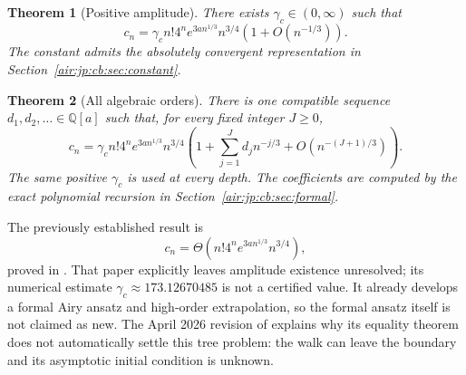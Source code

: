 \documentclass[11pt,letterpaper]{article}
\numberwithin{equation}{section}
\newtheorem{theorem}{Theorem}[section]
\theoremstyle{remark}
\newcommand{\Q}{\mathbb{Q}}
\begin{document}
\begin{theorem}[Positive amplitude]\label{air:jp:cb:thm:main}
There exists $\gamma_c\in(0,\infty)$ such that
\begin{equation}\label{air:jp:cb:eq:main}
 c_n=\gamma_c n!4^ne^{3an^{1/3}}n^{3/4}\left(1+O(n^{-1/3})\right).
\end{equation}
The constant admits the absolutely convergent representation in Section~\ref{air:jp:cb:sec:constant}.
\end{theorem}
\begin{theorem}[All algebraic orders]\label{air:jp:cb:thm:allorders}
There is one compatible sequence $d_1,d_2,\ldots\in\Q[a]$ such that, for every fixed integer $J\ge0$,
\begin{equation}\label{air:jp:cb:eq:allorders}
 c_n=\gamma_c n!4^ne^{3an^{1/3}}n^{3/4}
 \left(1+\sum_{j=1}^Jd_jn^{-j/3}+O(n^{-(J+1)/3})\right).
\end{equation}
The same positive $\gamma_c$ is used at every depth. The coefficients are computed by the exact polynomial recursion in Section~\ref{air:jp:cb:sec:formal}.
\end{theorem}

The previously established result is
\begin{equation}\label{air:jp:cb:eq:theta}
 c_n=\Theta\!\left(n!4^ne^{3an^{1/3}}n^{3/4}\right),
\end{equation}
proved in \cite[Theorem 1.1]{epfw}. That paper explicitly leaves amplitude existence unresolved; its numerical estimate $\gamma_c\approx173.12670485$ is not a certified value. It already develops a formal Airy ansatz and high-order extrapolation, so the formal ansatz itself is not claimed as new. The April 2026 revision of \cite[Section 10.1]{epflw} explains why its equality theorem does not automatically settle this tree problem: the walk can leave the boundary and its asymptotic initial condition is unknown.
\end{document}
